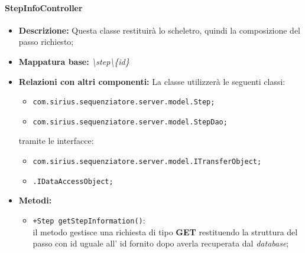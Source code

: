 \paragraph{StepInfoController}%
\begin{itemize}
	\item \textbf{Descrizione: }Questa classe restituirà lo scheletro, quindi la composizione del passo richiesto;
	\item \textbf{Mappatura base: }\textit{\textbackslash step\textbackslash \{id\}}
	\item \textbf{Relazioni con altri componenti: }
	La classe utilizzerà le seguenti classi:
	\begin{itemize}
		\item \texttt{com.sirius.sequenziatore.server.model.Step;}
		\item \texttt{com.sirius.sequenziatore.server.model.StepDao;}
	\end{itemize}
	tramite le interfacce:
	\begin{itemize}
		\item \texttt{com.sirius.sequenziatore.server.model.ITransferObject;}
		\item \texttt{\sModel .IDataAccessObject;}
	\end{itemize}
	\item \textbf{Metodi: }\begin{itemize}
					\item \texttt{+Step getStepInformation()}:\\
					 il metodo gestisce una richiesta di tipo \textbf{GET} restituendo la struttura del passo con id uguale all' id fornito dopo averla recuperata dal \textit{database};
				\end{itemize}
\end{itemize}
